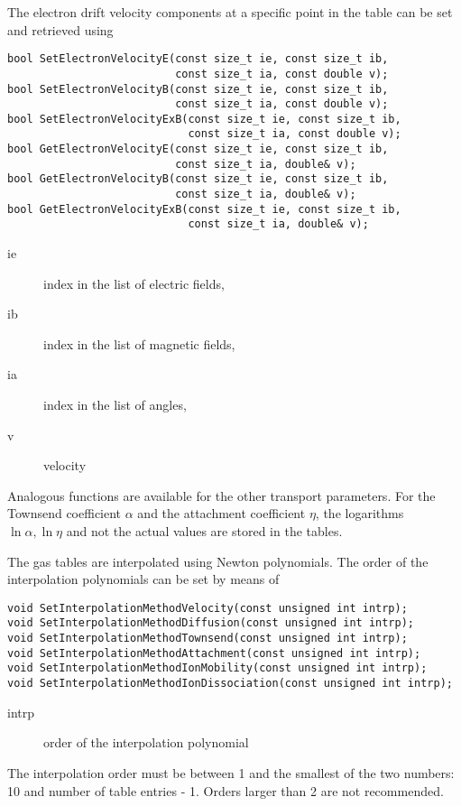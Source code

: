 The electron drift velocity components at a specific point in the table 
can be set and retrieved using
\begin{lstlisting}
bool SetElectronVelocityE(const size_t ie, const size_t ib,
                          const size_t ia, const double v);
bool SetElectronVelocityB(const size_t ie, const size_t ib,
                          const size_t ia, const double v);
bool SetElectronVelocityExB(const size_t ie, const size_t ib,
                            const size_t ia, const double v);
bool GetElectronVelocityE(const size_t ie, const size_t ib,
                          const size_t ia, double& v);
bool GetElectronVelocityB(const size_t ie, const size_t ib,
                          const size_t ia, double& v);
bool GetElectronVelocityExB(const size_t ie, const size_t ib,
                            const size_t ia, double& v);
\end{lstlisting}
\begin{description}
  \item[ie] index in the list of electric fields,
  \item[ib] index in the list of magnetic fields,
  \item[ia] index in the list of angles,
  \item[v] velocity
\end{description}
Analogous functions are available for the other transport parameters.
For the Townsend coefficient $\alpha$ and the attachment coefficient
$\eta$, the logarithms $\ln\alpha, \ln\eta$ and not the actual values 
are stored in the tables. 
 
The gas tables are interpolated using Newton polynomials. 
The order of the interpolation polynomials can be set by means of
\begin{lstlisting}
void SetInterpolationMethodVelocity(const unsigned int intrp);
void SetInterpolationMethodDiffusion(const unsigned int intrp);
void SetInterpolationMethodTownsend(const unsigned int intrp);
void SetInterpolationMethodAttachment(const unsigned int intrp);
void SetInterpolationMethodIonMobility(const unsigned int intrp);
void SetInterpolationMethodIonDissociation(const unsigned int intrp);
\end{lstlisting}
\begin{description}
\item[intrp]
order of the interpolation polynomial 
\end{description}
The interpolation order must be between 1 and the smallest of the two 
numbers: 10 and number of table entries - 1. 
Orders larger than 2 are not recommended.

